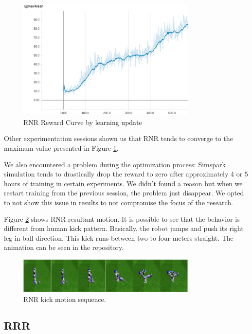 \begin{figure}[!htbp]
	\centering
	\includegraphics[width=0.8\textwidth]{Cap6/rnrreward.eps}
	\caption{RNR Reward Curve by learning update}
	\label{fig:rnrreward}
\end{figure}

Other experimentation sessions shown us that RNR tends to converge to the maximum value presented in Figure \ref{fig:rnrreward}.

We also encountered a problem during the optimization process: Simspark simulation tends to drastically drop the reward to zero after approximately 4 or 5 hours of training in certain experiments. We didn't found a reason but when we restart training from the previous session, the problem just disappear. We opted to not show this issue in results to not compromise the focus of the research.

Figure \ref{fig:rnr_kick_sequence} shows RNR resultant motion. It is possible to see that the behavior is different from human kick pattern. Basically, the robot jumps and push its right leg in ball direction. This kick runs between two to four meters straight. The animation can be seen in the repository.

\begin{figure}[!htbp]
	\centering
	\includegraphics[width=0.8\textwidth]{Cap6/rnr_kick_sequence.eps}
	\caption{RNR kick motion sequence.}
	\label{fig:rnr_kick_sequence}
\end{figure}

\subsection{RRR}

